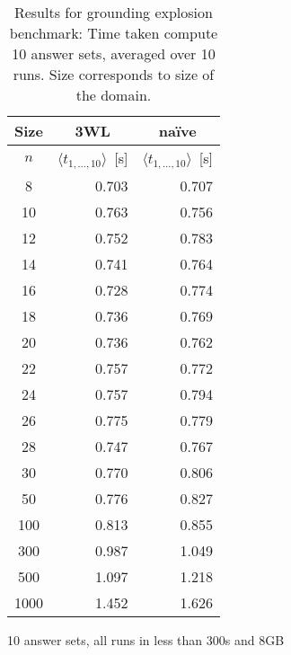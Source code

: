 \documentclass{vutinfth} %
\begin{document}
\begin{table}
\begin{center}
\begin{tabular}{|c||r|r|}
\hline
Size & \multicolumn{1}{c|}{3WL} & \multicolumn{1}{c|}{na\"{i}ve} \\ 
\hline
$n$ & $\langle t_{1, \ldots, 10} \rangle$~[s]& $\langle t_{1, \ldots, 10} \rangle$~[s]\\
\hline
\hline
   8 & 	  0.703 &	  0.707 \\
  10 & 	  0.763 &	  0.756 \\
  12 & 	  0.752 &	  0.783 \\
  14 & 	  0.741 &	  0.764 \\
  16 & 	  0.728 &	  0.774 \\
  18 & 	  0.736 &	  0.769 \\
  20 & 	  0.736 &	  0.762 \\
  22 & 	  0.757 &	  0.772 \\
  24 & 	  0.757 &	  0.794 \\
  26 & 	  0.775 &	  0.779 \\
  28 & 	  0.747 &	  0.767 \\
  30 & 	  0.770 &	  0.806 \\
  50 & 	  0.776 &	  0.827 \\
 100 & 	  0.813 &	  0.855 \\
 300 & 	  0.987 &	  1.049 \\
 500 & 	  1.097 &	  1.218 \\
1000 & 	  1.452 &	  1.626 \\
\hline
\end{tabular}

\hspace{3mm}

10 answer sets, all runs in less than 300s and 8GB
\end{center}
\caption[Results for grounding explosion benchmark]{Results for grounding explosion benchmark: Time taken compute 10 answer sets, averaged over 10 runs. Size corresponds to size of the domain.}
\label{tbl:gex}
\end{table}
\end{document}
